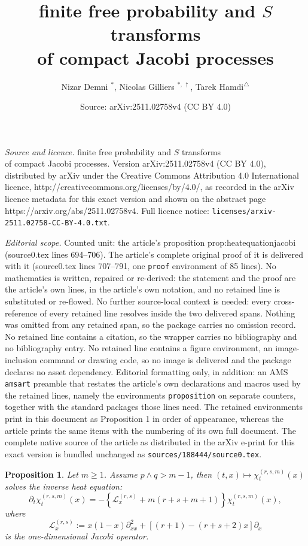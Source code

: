 \documentclass[10pt,a4paper]{amsart}
\title{finite free probability and $S$ transforms \\ of compact Jacobi processes}
\author{Nizar Demni ${}^{*}$, Nicolas Gilliers ${}^{*,\,\dagger}$, Tarek Hamdi${}^{\triangle}$}
\date{Source: arXiv:2511.02758v4 (CC BY 4.0)}
\newtheorem{proposition}{Proposition}
\begin{document}
\maketitle

\noindent\emph{Source and licence.} finite free probability and $S$ transforms \\ of compact Jacobi processes. Version arXiv:2511.02758v4 (CC BY 4.0), distributed by arXiv under the Creative Commons Attribution 4.0 International licence, http://creativecommons.org/licenses/by/4.0/, as recorded in the arXiv licence metadata for this exact version and shown on the abstract page https://arxiv.org/abs/2511.02758v4. Full licence notice: \texttt{licenses/arxiv-2511.02758-CC-BY-4.0.txt}.\par\smallskip

\noindent\textit{Editorial scope.} Counted unit: the article's proposition prop:heatequationjacobi (source0.tex lines 694--706). The article's complete original proof of it is delivered with it (source0.tex lines 707--791, one \texttt{proof} environment of 85 lines). No mathematics is written, repaired or re-derived: the statement and the proof are the article's own lines, in the article's own notation, and no retained line is substituted or re-flowed.  No further source-local context is needed: every cross-reference of every retained line resolves inside the two delivered spans.  Nothing was omitted from any retained span, so the package carries no omission record.  No retained line contains a citation, so the wrapper carries no bibliography and no bibliography entry.  No retained line contains a figure environment, an image-inclusion command or drawing code, so no image is delivered and the package declares no asset dependency.  Editorial formatting only, in addition: an AMS \texttt{amsart} preamble that restates the article's own declarations and macros used by the retained lines, namely the environments \texttt{proposition} on separate counters, together with the standard packages those lines need.  The retained environments print in this document as Proposition 1 in order of appearance, whereas the article prints the same items with the numbering of its own full document.  The complete native source of the article as distributed in the arXiv e-print for this exact version is bundled unchanged as \texttt{sources/188444/source0.tex}.
\begin{proposition}
	\label{prop:heatequationjacobi}
	Let $m\geq 1$. Assume $p \wedge q > m-1$, then $(t,x) \mapsto \chi_t^{(r,s,m)}(x)$ solves the inverse heat equation:
	\begin{equation*}
		\partial_t\chi_t^{(r,s,m)}(x) = -\left\{\mathcal{L}_x^{(r,s)} + m(r+s+m+1) \right\}
		\chi_t^{(r,s,m)}(x),
	\end{equation*}
	where
	\begin{equation*}
		\mathcal{L}_x^{(r,s)} := x(1-x)\partial_{xx}^2 + [(r+1) - (r+s+2)x]\partial_x
	\end{equation*}
	is the one-dimensional Jacobi operator.
\end{proposition}
\end{document}
